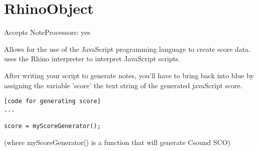 \section{RhinoObject}\label{rhinoObject}

Accepts NoteProcessors: yes

Allows for the use of the JavaScript programming language to create
score data. uses the Rhino interpreter to interpret JavaScript scripts.

After writing your script to generate notes, you'll have to bring back
into blue by assigning the variable 'score' the text string of the
generated javaScript score.

\begin{verbatim}
[code for generating score]
...
         
score = myScoreGenerator();
\end{verbatim}

(where myScoreGenerator() is a function that will generate Csound SCO)
